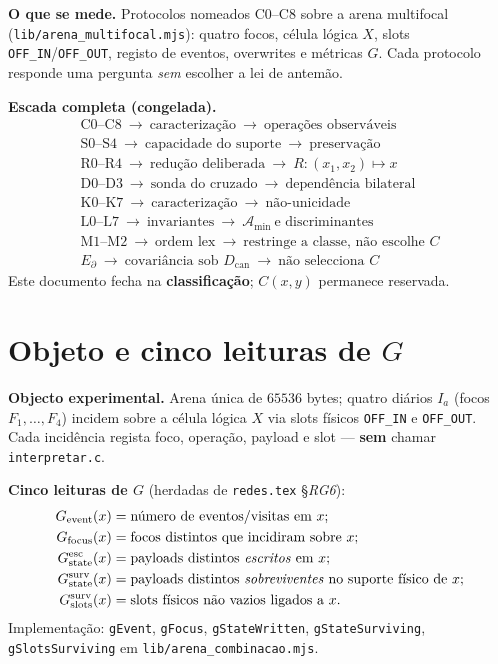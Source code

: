 \documentclass[11pt,a4paper]{article}
\newcommand{\code}[1]{\texttt{\small #1}}
\newcommand{\redes}[1]{\code{redes.tex} §\textit{#1}}
\begin{document}
\medskip\noindent\textbf{O que se mede.} Protocolos nomeados C0--C8 sobre a arena
multifocal (\code{lib/arena\_multifocal.mjs}): quatro focos, célula lógica $X$,
slots \code{OFF\_IN}/\code{OFF\_OUT}, registo de eventos, overwrites e métricas $G$.
Cada protocolo responde uma pergunta \emph{sem} escolher a lei de antemão.

\medskip\noindent\textbf{Escada completa (congelada).}
{\small
\[
\begin{array}{c}
\text{C0--C8}\ \to\ \text{caracterização}\ \to\ \text{operações observáveis}\\
\text{S0--S4}\ \to\ \text{capacidade do suporte}\ \to\ \text{preservação}\\
\text{R0--R4}\ \to\ \text{redução deliberada}\ \to\ R\colon(x_1,x_2)\mapsto x\\
\text{D0--D3}\ \to\ \text{sonda do cruzado}\ \to\ \text{dependência bilateral}\\
\text{K0--K7}\ \to\ \text{caracterização}\ \to\ \text{não-unicidade}\\
\text{L0--L7}\ \to\ \text{invariantes}\ \to\ \mathcal A_{\min}\ \text{e discriminantes}\\
\text{M1--M2}\ \to\ \text{ordem lex}\ \to\ \text{restringe a classe, não escolhe }C\\
\text{$E_{\partial}$}\ \to\ \text{covariância sob }D_{\mathrm{can}}\ \to\ \text{não selecciona }C
\end{array}
\]}
Este documento fecha na \textbf{classificação}; $C(x,y)$ permanece reservada.

\section{Objeto e cinco leituras de $G$}\label{comb:objeto}

\noindent\textbf{Objecto experimental.} Arena única de $65536$ bytes; quatro diários
$I_a$ (focos $F_1,\ldots,F_4$) incidem sobre a célula lógica $X$ via slots físicos
\code{OFF\_IN} e \code{OFF\_OUT}. Cada incidência regista foco, operação, payload e
slot --- \textbf{sem} chamar \code{interpretar.c}.

\medskip\noindent\textbf{Cinco leituras de $G$} (herdadas de \redes{RG6}):
{\small
\begin{align*}
G_{\mathrm{event}}(x) &= \text{número de eventos/visitas em }x;\\
G_{\mathrm{focus}}(x) &= \text{focos distintos que incidiram sobre }x;\\
G_{\mathrm{state}}^{\mathrm{esc}}(x) &= \text{payloads distintos \emph{escritos} em }x;\\
G_{\mathrm{state}}^{\mathrm{surv}}(x) &= \text{payloads distintos \emph{sobreviventes}
no suporte físico de }x;\\
G_{\mathrm{slots}}^{\mathrm{surv}}(x) &= \text{slots físicos não vazios ligados a }x.
\end{align*}}
Implementação: \code{gEvent}, \code{gFocus}, \code{gStateWritten},
\code{gStateSurviving}, \code{gSlotsSurviving} em \code{lib/arena\_combinacao.mjs}.
\end{document}

